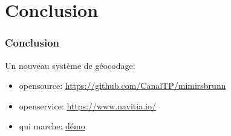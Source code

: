 \documentclass[table]{beamer}
\begin{document}
\section{Conclusion}

\begin{frame}
  \frametitle{Conclusion}

  Un nouveau système de géocodage:
  \begin{itemize}
  \item opensource: \url{https://github.com/CanalTP/mimirsbrunn}
  \item openservice: \url{https://www.navitia.io/}
  \item qui marche: \href{http://canaltp.github.io/navitia-playground/play.html?request=https\%3A\%2F\%2Fapi.navitia.io\%2Fv1\%2Fplaces\%3Fq\%3D20\%2520hec\%2520mal\%26from\%3D2.364391\%253B48.866436\%26&token=4e5c-bf9d-4fc9-8a60-d47fb98b1b0e}{démo}
  \end{itemize}
\end{frame}

\begin{frame}
  \titlepage
\end{frame}
\end{document}
